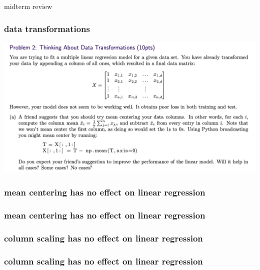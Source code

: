 \documentclass[handout,compress]{beamer}
\begin{document}
\begin{frame}[standout]
	midterm review
\end{frame}

\begin{frame}
	\frametitle{data transformations}
	\includegraphics[width=\textwidth]{data_transformations.png}
	
\end{frame}

\begin{frame}
	\frametitle{mean centering has no effect on linear regression}
\end{frame}

\begin{frame}
	\frametitle{mean centering has no effect on linear regression}
\end{frame}

\begin{frame}
	\frametitle{column scaling has no effect on linear regression}
\end{frame}

\begin{frame}
	\frametitle{column scaling has no effect on linear regression}
\end{frame}
\end{document}
